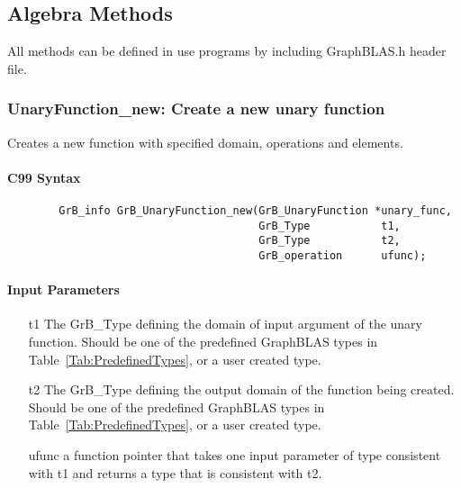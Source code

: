 \subsection{Algebra Methods}

All methods can be defined in use programs by including {\sf GraphBLAS.h} header file.


\subsubsection{{\sf UnaryFunction\_new}: Create a new unary function}

Creates a new function with specified domain, operations and elements.

\paragraph{C99 Syntax}

\begin{verbatim}
        GrB_info GrB_UnaryFunction_new(GrB_UnaryFunction *unary_func,
                                       GrB_Type           t1,
                                       GrB_Type           t2,
                                       GrB_operation      ufunc);
\end{verbatim}

\paragraph{Input Parameters}

\begin{itemize}[leftmargin=1.1in]
    \item[{\sf t1}] The {\sf GrB\_Type} defining the domain of input argument of
    the unary function. Should be one of the predefined
    GraphBLAS types in Table~\ref{Tab:PredefinedTypes}, or a user created type.
    \item[{\sf t2}] The {\sf GrB\_Type} defining the output domain of the function
    being created.  Should be one of the predefined
    GraphBLAS types in Table~\ref{Tab:PredefinedTypes}, or a user created type.
    \item[{\sf ufunc}] a function pointer that takes one input parameter of type consistent
    with t1 and returns a type that is consistent with t2.
\end{itemize}

